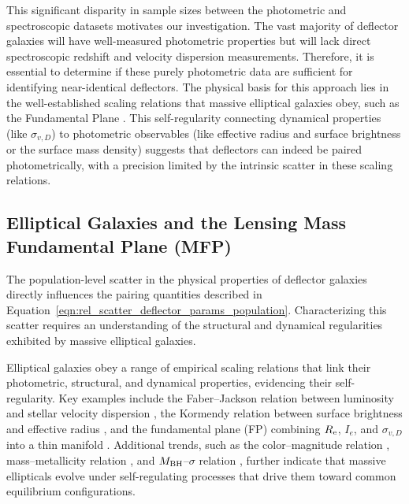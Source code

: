 \documentclass[a4paper,11pt]{article}
\begin{document}
This significant disparity in sample sizes between the photometric and spectroscopic datasets motivates our investigation. The vast majority of deflector galaxies will have well-measured photometric properties but will lack direct spectroscopic redshift and velocity dispersion measurements. Therefore, it is essential to determine if these purely photometric data are sufficient for identifying near-identical deflectors. The physical basis for this approach lies in the well-established scaling relations that massive elliptical galaxies obey, such as the Fundamental Plane \citep{Djorgovski:1987, Dressler:1987}. This self-regularity connecting dynamical properties (like $\sigma_{v, D}$) to photometric observables (like effective radius and surface brightness or the surface mass density) suggests that deflectors can indeed be paired photometrically, with a precision limited by the intrinsic scatter in these scaling relations.


\subsection{Elliptical Galaxies and the Lensing Mass Fundamental Plane (MFP)}
\label{subsec:ellipticals_and_mfp}
The population-level scatter in the physical properties of deflector galaxies directly influences the pairing quantities described in Equation~\ref{eqn:rel_scatter_deflector_params_population}. Characterizing this scatter requires an understanding of the structural and dynamical regularities exhibited by massive elliptical galaxies.

Elliptical galaxies obey a range of empirical scaling relations that link their photometric, structural, and dynamical properties, evidencing their self-regularity. Key examples include the Faber–Jackson relation between luminosity and stellar velocity dispersion \citep{Faber:1976}, the Kormendy relation between surface brightness and effective radius \citep{Kormendy:1977}, and the fundamental plane (FP) combining $R_{\rm e}$, $I_{e}$, and $\sigma_{v,D}$ into a thin manifold \citep{Djorgovski:1987, Dressler:1987}. Additional trends, such as the color–magnitude relation \citep{Bower:1992}, mass–metallicity relation \citep{Gallazzi:2005}, and $M_{\rm BH}$–$\sigma$ relation \citep{Ferrarese:2000, Gebhardt:2000}, further indicate that massive ellipticals evolve under self-regulating processes that drive them toward common equilibrium configurations.
\end{document}
